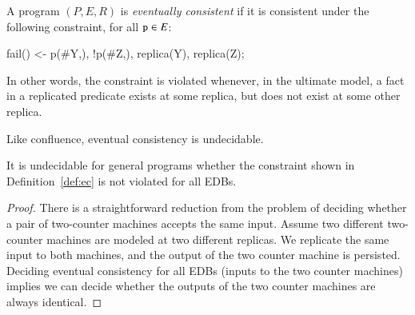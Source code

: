 
\begin{definition}
\label{def:ec}
A \lang program $(P, E, R)$ is {\em eventually consistent} if it is consistent under the following constraint, for all $\dedalus{p} \in E$:

\begin{Dedalus}
fail() <- p(#Y,), !p(#Z,), replica(Y), replica(Z);
\end{Dedalus}

In other words, the constraint is violated whenever, in the ultimate model, a fact in a replicated predicate exists at some replica, but does not exist at some other replica.
\end{definition}


Like confluence, eventual consistency is undecidable.

\begin{lemma}
It is undecidable for general \lang programs whether the constraint shown in Definition~\ref{def:ec} is not violated for all EDBs.
\end{lemma}
\begin{proof}
There is a straightforward reduction from the problem of deciding whether a pair of two-counter machines accepts the same input.  Assume two different two-counter machines are modeled at two different replicas.  We replicate the same input to both machines, and the output of the two counter machine is persisted.  Deciding eventual consistency for all EDBs (inputs to the two counter machines) implies we can decide whether the outputs of the two counter machines are always identical.
\end{proof}




